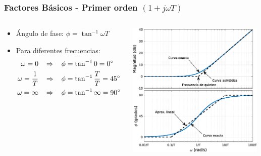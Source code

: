 \documentclass[aspectratio=169]{beamer}
\theoremstyle{definition}
\theoremstyle{plain}
\theoremstyle{remark}
\begin{document}
\begin{frame}[<+->]\frametitle{Factores Básicos - Primer orden $(1+j \omega T)$}
\vspace*{8mm}
\begin{columns}
	\begin{column}{0.5\textwidth}
	\small
	\begin{itemize}
		\item Ángulo de fase: $\phi = \tan^{-1} \omega T$
		\item Para diferentes frecuencias:
		\begin{align*}
			\omega = 0 \hspace*{3mm} &\Rightarrow \hspace*{3mm} \phi = \tan^{-1} 0 = \ang{0}\\
			\omega = \frac{1}{T} \hspace*{3mm} &\Rightarrow \hspace*{3mm} \phi = \tan^{-1}\frac{T}{T} = \ang{45}\\
			\omega = \infty \hspace*{3mm} &\Rightarrow \hspace*{3mm} \phi =  \tan^{-1} \infty = \ang{90}
		\end{align*}
	\end{itemize}
	\end{column}
	\begin{column}{0.5\textwidth}
	\centering
	\includegraphics[width=6.5cm]{images/bodeFirstOrderDerivative.eps}
	\end{column}
\end{columns}
\end{frame}
\end{document}
